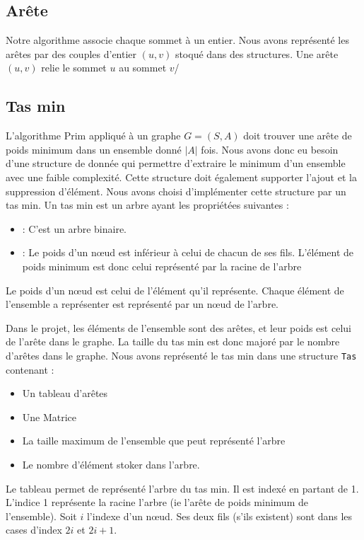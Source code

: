 \documentclass[a4paper,11pt]{article}
\begin{document}
\subsection{Arête}
Notre algorithme associe chaque sommet à un entier. Nous avons représenté les arêtes par des couples d'entier $(u, v)$ stoqué dans des structures. Une arête $(u, v)$ relie le sommet $u$ au sommet $v$/

\subsection{Tas min} %
L'algorithme Prim appliqué à un graphe $G = (S, A)$ doit trouver une arête de poids minimum dans un ensemble donné $|A|$ fois.
Nous avons donc eu besoin d'une structure de donnée qui permettre d'extraire le minimum d'un ensemble avec une faible complexité. Cette structure doit également supporter l'ajout et la suppression d'élément.
Nous avons choisi d’implémenter cette structure par un tas min.
Un tas min est un arbre ayant les propriétées suivantes :
\begin{itemize}
\item : C'est un arbre binaire.
\item : Le poids d'un nœud est inférieur à celui de chacun de ses fils. L'élément de poids minimum est donc celui représenté par la racine de l'arbre
\end{itemize}
Le poids d'un nœud est celui de l'élément qu'il représente.
Chaque élément de l'ensemble a représenter est représenté par un nœud de l'arbre.

Dans le projet, les éléments de l'ensemble sont des arêtes, et leur poids est celui de l’arête dans le graphe. La taille du tas min est donc majoré par le nombre d’arêtes dans le graphe.
Nous avons représenté le tas min dans une structure \texttt{Tas} contenant :
\begin{itemize}
\item Un tableau d’arêtes
\item Une Matrice
\item La taille maximum de l'ensemble que peut représenté l'arbre
\item Le nombre d'élément stoker dans l'arbre.
\end{itemize}
Le tableau permet de représenté l'arbre du tas min. Il est indexé en partant de 1.
L'indice 1 représente la racine l'arbre (ie l’arête de poids minimum de l'ensemble).
Soit $i$ l'indexe d'un nœud. Ses deux fils (s'ils existent) sont dans les cases d'index $2i$ et $2i +1$.
\end{document}
